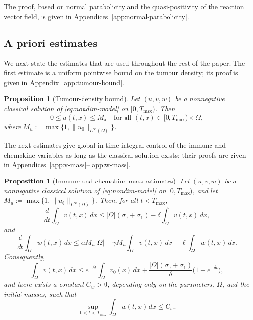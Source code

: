 \documentclass[a4paper,fleqn,longmktitle]{cas-sc}
\theoremstyle{plain}
\newtheorem{proposition}[theorem]{Proposition}
\theoremstyle{definition}
\numberwithin{equation}{section}
\begin{document}
The proof, based on normal parabolicity and the quasi-positivity of the reaction
vector field, is given in
Appendices~\ref{app:normal-parabolicity}.

\subsection{A priori estimates}
\label{subsec:apriori-estimates}

We next state the estimates that are used throughout the rest of the paper.
The first estimate is a uniform pointwise bound on the tumour density; its proof
is given in Appendix~\ref{app:tumour-bound}.

\begin{proposition}[Tumour-density bound]
\label{prop:tumour-density-bound}
Let $(u,v,w)$ be a nonnegative classical solution of
\eqref{eq:nondim-model} on $[0,T_{\max})$. Then
\[
0\le u(t,x)\le M_u
\quad\text{for all }(t,x)\in[0,T_{\max})\times\overline\Omega,
\]
where $M_u:=\max\{1,\|u_0\|_{L^\infty(\Omega)}\}$.
\end{proposition}

The next estimates give global-in-time integral control of the immune and
chemokine variables as long as the classical solution exists; their proofs are
given in Appendices~\ref{app:v-mass}--\ref{app:w-mass}.

\begin{proposition}[Immune and chemokine mass estimates]
\label{prop:mass-estimates}
Let $(u,v,w)$ be a nonnegative classical solution of
\eqref{eq:nondim-model} on $[0,T_{\max})$, and let $M_u:=\max\{1,\|u_0\|_{L^\infty(\Omega)}\}$.
Then, for all $t<T_{\max}$,
\begin{equation}\label{eq:v-mass-differential}
\frac{d}{dt}\int_\Omega v(t,x)\,dx
\le
|\Omega|(\sigma_0+\sigma_1)-\delta\int_\Omega v(t,x)\,dx,
\end{equation}
and
\begin{equation}\label{eq:w-mass-differential}
\frac{d}{dt}\int_\Omega w(t,x)\,dx
\le
\alpha M_u|\Omega|
+\gamma M_u\int_\Omega v(t,x)\,dx
-\ell\int_\Omega w(t,x)\,dx .
\end{equation}
Consequently,
\begin{equation}\label{eq:v-mass-bound}
\int_\Omega v(t,x)\,dx
\le
e^{-\delta t}\int_\Omega v_0(x)\,dx
+
\frac{|\Omega|(\sigma_0+\sigma_1)}{\delta}
\bigl(1-e^{-\delta t}\bigr),
\end{equation}
and there exists a constant $C_w>0$, depending only on the parameters, $\Omega$,
and the initial masses, such that
\begin{equation}\label{eq:w-mass-bound}
\sup_{0<t<T_{\max}}\int_\Omega w(t,x)\,dx\le C_w .
\end{equation}
\end{proposition}
\end{document}
